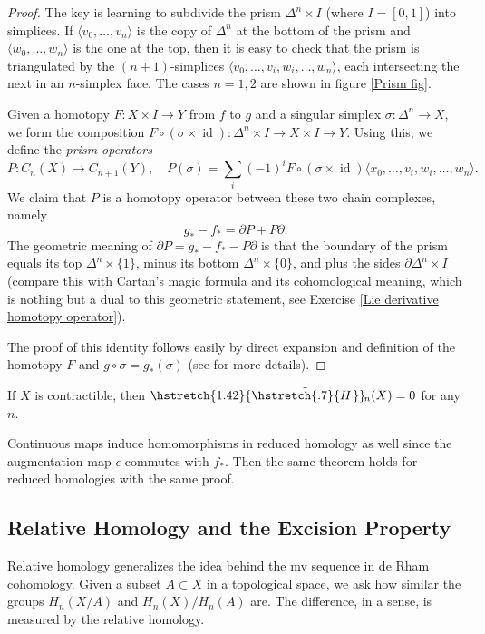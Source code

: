 \documentclass[english,letterpaper]{article}%
\numberwithin{equation}{section}
\numberwithin{figure}{section}
\numberwithin{table}{section}
\theoremstyle{definition}
\theoremstyle{definition}
\theoremstyle{definition}
\theoremstyle{plain}
\theoremstyle{plain}
\theoremstyle{plain}
\theoremstyle{plain}
\theoremstyle{remark}
\theoremstyle{remark}
\DeclareMathOperator{\id}{id}
\newcommand\wt[1]{\hstretch{1.42}{\tilde{\hstretch{.7}{#1\mkern2mu}}}\mkern-2mu}
\begin{document}
\begin{proof}
     The key is learning to subdivide the prism $\Delta^n\times I$ (where $I=[0,1]$) into simplices. If $\langle v_0,\ldots,v_n\rangle$ is the copy of $\Delta^n$ at the bottom of the prism and $\langle w_0,\ldots,w_n\rangle$ is the one at the top, then it is easy to check that the prism is triangulated by the $(n+1)$-simplices $\langle v_0,\ldots,v_i,w_i,\ldots,w_n\rangle$, each intersecting the next in an $n$-simplex face. The cases $n=1,2$ are shown in figure \ref{Prism fig}.
     
     Given a homotopy $F:X\times I\to Y$ from $f$ to $g$ and a singular simplex $\sigma:\Delta^n\to X$, we form the composition $F\circ(\sigma\times \id):\Delta^n\times I\to X\times I\to Y$. Using this, we define the \emph{prism operators}
     \[P:C_n(X)\to C_{n+1}(Y),\quad P(\sigma)=\sum_i(-1)^i F\circ (\sigma\times\id)\langle x_0,\ldots,v_i,w_i,\ldots,w_n\rangle.\]
     We claim that $P$ is a homotopy operator between these two chain complexes, namely
     \[g_\ast-f_\ast=\partial P+P\partial.\]
     The geometric meaning of $\partial P=g_\ast-f_\ast-P\partial$ is that the boundary of the prism equals its top $\Delta^n\times\{1\}$, minus its bottom $\Delta^n\times\{0\}$, and plus the sides $\partial\Delta^n\times I$ (compare this with Cartan's magic formula and its cohomological meaning, which is nothing but a dual to this geometric statement, see Exercise \ref{Lie derivative homotopy operator}).
     
     The proof of this identity follows easily by direct expansion and definition of the homotopy $F$ and $g\circ\sigma=g_\ast(\sigma)$ (see \cite[Thm.~2.10]{Hatcher} for more details).
\end{proof}
\begin{cor}
    If $X$ is contractible, then $\wt{H}_n(X)=0$ for any $n$.
\end{cor}


Continuous maps induce homomorphisms in reduced homology as well since the augmentation map $\epsilon$ commutes with $f_\ast$. Then the same theorem holds for reduced homologies with the same proof.




\subsection{Relative Homology and the Excision Property}

Relative homology generalizes the idea behind the \gls{mv} sequence in de Rham cohomology. Given a subset $A\subset X$ in a topological space, we ask how similar the groups $H_n(X/A)$ and $H_n(X)/H_n(A)$ are. The difference, in a sense, is measured by the relative homology.
\end{document}
